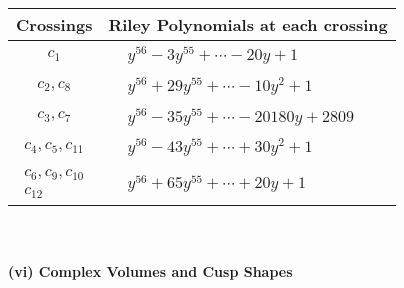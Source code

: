 \documentclass[1p]{elsarticle_modified}
\theoremstyle{definition}
\begin{document}
\begin{tabular}{m{50pt}|m{274pt}}
Crossings & \hspace{64pt}Riley Polynomials at each crossing \\
\hline $$\begin{aligned}c_{1}\end{aligned}$$&$\begin{aligned}
&y^{56}-3 y^{55}+\cdots-20 y+1
\end{aligned}$\\
\hline $$\begin{aligned}c_{2},c_{8}\end{aligned}$$&$\begin{aligned}
&y^{56}+29 y^{55}+\cdots-10 y^2+1
\end{aligned}$\\
\hline $$\begin{aligned}c_{3},c_{7}\end{aligned}$$&$\begin{aligned}
&y^{56}-35 y^{55}+\cdots-20180 y+2809
\end{aligned}$\\
\hline $$\begin{aligned}c_{4},c_{5},c_{11}\end{aligned}$$&$\begin{aligned}
&y^{56}-43 y^{55}+\cdots+30 y^2+1
\end{aligned}$\\
\hline $$\begin{aligned}c_{6},c_{9},c_{10}\\c_{12}\end{aligned}$$&$\begin{aligned}
&y^{56}+65 y^{55}+\cdots+20 y+1
\end{aligned}$\\
\hline
\end{tabular}\\~\\
\newpage\flushleft \textbf{(vi) Complex Volumes and Cusp Shapes}
\end{document}
